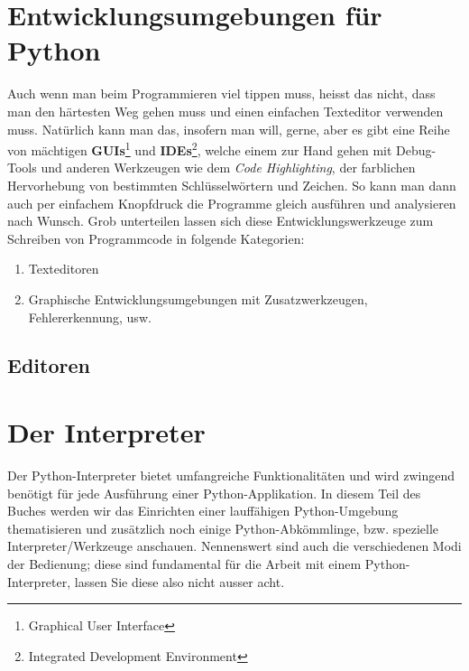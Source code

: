 \documentclass[b5paper,10pt,dvips,fleqn,titlepage,twoside]{book}
\begin{document}
\section{Entwicklungsumgebungen für Python}
Auch wenn man beim Programmieren viel tippen muss, heisst das nicht, dass man den härtesten Weg gehen muss und einen einfachen Texteditor verwenden muss. Natürlich kann man das, insofern man will, gerne, aber es gibt eine Reihe von mächtigen \textbf{GUIs}\footnote{Graphical User Interface} und \textbf{IDEs}\footnote{Integrated Development Environment}, welche einem zur Hand gehen mit Debug-Tools und anderen Werkzeugen wie dem \emph{Code Highlighting}, der farblichen Hervorhebung von bestimmten Schlüsselwörtern und Zeichen.
So kann man dann auch per einfachem Knopfdruck die Programme gleich ausführen und analysieren nach Wunsch.\newline\newline 
{}
\newline\newline
Grob unterteilen lassen sich diese Entwicklungswerkzeuge zum Schreiben von Programmcode in folgende Kategorien:
\begin{enumerate}
\item Texteditoren
\item Graphische Entwicklungsumgebungen mit Zusatzwerkzeugen, Fehlererkennung, usw.
\end{enumerate}

\subsection{Editoren}
\section{Der Interpreter}
Der Python-Interpreter bietet umfangreiche Funktionalitäten und wird zwingend benötigt für jede Ausführung einer Python-Applikation.
In diesem Teil des Buches werden wir das Einrichten einer lauffähigen Python-Umgebung thematisieren und zusätzlich noch einige Python-Abkömmlinge, bzw. spezielle Interpreter/Werkzeuge anschauen.
Nennenswert sind auch die verschiedenen Modi der Bedienung; diese sind fundamental für die Arbeit mit einem Python-Interpreter, lassen Sie diese also nicht ausser acht.\newline
\end{document}
